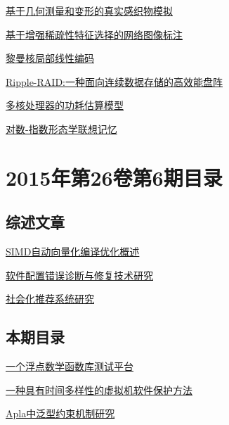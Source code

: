 \documentclass[a4paper]{article}
\begin{document}
\href{http://www.jos.org.cn/ch/reader/download_pdf.aspx?file_no=4614&year_id=2015&quarter_id=7&falg=1}{基于几何测量和变形的真实感织物模拟}

\href{http://www.jos.org.cn/ch/reader/download_pdf.aspx?file_no=4687&year_id=2015&quarter_id=7&falg=1}{基于增强稀疏性特征选择的网络图像标注}

\href{http://www.jos.org.cn/ch/reader/download_pdf.aspx?file_no=4714&year_id=2015&quarter_id=7&falg=1}{黎曼核局部线性编码}

\href{http://www.jos.org.cn/ch/reader/download_pdf.aspx?file_no=4606&year_id=2015&quarter_id=7&falg=1}{Ripple-RAID:一种面向连续数据存储的高效能盘阵}

\href{http://www.jos.org.cn/ch/reader/download_pdf.aspx?file_no=4706&year_id=2015&quarter_id=7&falg=1}{多核处理器的功耗估算模型}

\href{http://www.jos.org.cn/ch/reader/download_pdf.aspx?file_no=4620&year_id=2015&quarter_id=7&falg=1}{对数-指数形态学联想记忆}


\section{\textbf{2015年第26卷第6期目录}}
\subsection{综述文章}
\href{http://www.jos.org.cn/ch/reader/download_pdf.aspx?file_no=4811&year_id=2015&quarter_id=6&falg=1}{SIMD自动向量化编译优化概述}

\href{http://www.jos.org.cn/ch/reader/download_pdf.aspx?file_no=4823&year_id=2015&quarter_id=6&falg=1}{软件配置错误诊断与修复技术研究}

\href{http://www.jos.org.cn/ch/reader/download_pdf.aspx?file_no=4831&year_id=2015&quarter_id=6&falg=1}{社会化推荐系统研究}

\subsection{本期目录}
\href{http://www.jos.org.cn/ch/reader/download_pdf.aspx?file_no=4589&year_id=2015&quarter_id=6&falg=1}{一个浮点数学函数库测试平台}

\href{http://www.jos.org.cn/ch/reader/download_pdf.aspx?file_no=4592&year_id=2015&quarter_id=6&falg=1}{一种具有时间多样性的虚拟机软件保护方法}

\href{http://www.jos.org.cn/ch/reader/download_pdf.aspx?file_no=4628&year_id=2015&quarter_id=6&falg=1}{Apla中泛型约束机制研究}
\end{document}

